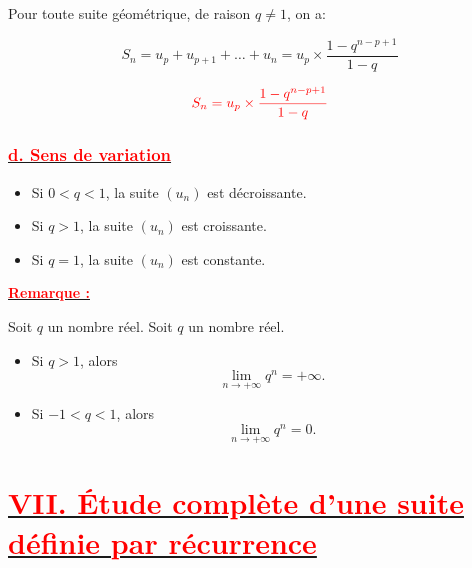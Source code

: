 \documentclass[12pt,a4paper]{article}
\begin{document}
Pour toute suite géométrique, de raison $q\neq 1$, on a:

$$S_{n}=u_{p}+u_{p+1}+\ldots+u_{n}=u_{p}\times\dfrac{1-q^{n-p+1}}{1-q}$$

\begin{mdframed}[linecolor=red] %
    \[
    \color{red} S_{n}=u_{p}\times\dfrac{1-q^{n-p+1}}{1-q}
    \]
\end{mdframed}
\subsubsection*{\underline{\textbf{\textcolor{red}{d. Sens de variation}}}}
    \begin{itemize}
        \item Si $0 < q < 1$, la suite $\left(u_{n}\right)$ est décroissante.
        \item Si $q > 1$, la suite $\left(u_{n}\right)$ est croissante.
        \item Si $q=1$, la suite $\left(u_{n}\right)$ est constante.
    \end{itemize}


\underline{\textbf{\textcolor{red}{Remarque :}}}

Soit $q$ un nombre réel.
Soit \( q \) un nombre réel.

\begin{itemize}
    \item Si \( q > 1 \), alors
    \[
    \lim_{n \rightarrow +\infty} q^n = +\infty.
    \]
    
    \item Si \( -1 < q < 1 \), alors
    \[
    \lim_{n \rightarrow +\infty} q^n = 0.
    \]
\end{itemize}

\section*{\underline{\textbf{\textcolor{red}{VII. Étude complète d'une suite définie par récurrence}}}}
\end{document}
